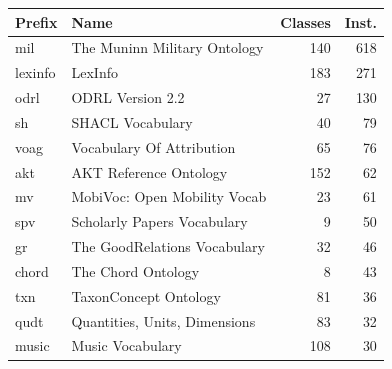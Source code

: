 \begin{table}[h]
\footnotesize
\centering
\begin{tabular}{|l|l|r|r|}
\hline
\textbf{Prefix} & \textbf{Name}                                                                 & \textbf{Classes} & \textbf{Inst.} \\ \hline
mil             & The Muninn Military Ontology                                                  & 140              & 618            \\ \hline
lexinfo         & LexInfo                                                                       & 183              & 271            \\ \hline
odrl            & ODRL Version 2.2                                                              & 27               & 130            \\ \hline
sh              & SHACL Vocabulary                                                              & 40               & 79             \\ \hline
voag            & Vocabulary Of Attribution                                                     & 65               & 76             \\ \hline
akt             & AKT Reference Ontology                                                        & 152              & 62             \\ \hline
mv              & MobiVoc: Open Mobility Vocab                                                  & 23               & 61             \\ \hline
spv             & Scholarly Papers Vocabulary                                                   & 9                & 50             \\ \hline
gr              & The GoodRelations Vocabulary                                                  & 32               & 46             \\ \hline
chord           & The Chord Ontology                                                            & 8                & 43             \\ \hline
txn             & TaxonConcept Ontology                                                         & 81               & 36             \\ \hline
qudt            & Quantities, Units, Dimensions                                                 & 83               & 32             \\ \hline
music           & Music Vocabulary                                                              & 108              & 30             \\ \hline

\end{tabular}
\end{table}
